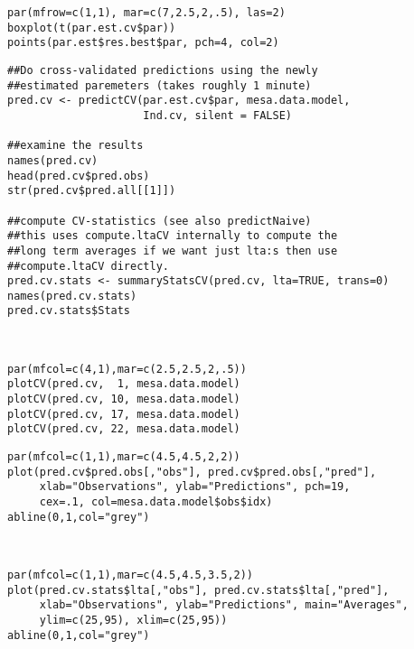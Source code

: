 %
\vspace*{-1\baselineskip}
\begin{verbatim}
par(mfrow=c(1,1), mar=c(7,2.5,2,.5), las=2)
boxplot(t(par.est.cv$par))
points(par.est$res.best$par, pch=4, col=2)
\end{verbatim}
\begin{verbatim}
##Do cross-validated predictions using the newly 
##estimated paremeters (takes roughly 1 minute)
pred.cv <- predictCV(par.est.cv$par, mesa.data.model,
                     Ind.cv, silent = FALSE)

##examine the results
names(pred.cv)
head(pred.cv$pred.obs)
str(pred.cv$pred.all[[1]])

##compute CV-statistics (see also predictNaive)
##this uses compute.ltaCV internally to compute the
##long term averages if we want just lta:s then use 
##compute.ltaCV directly.
pred.cv.stats <- summaryStatsCV(pred.cv, lta=TRUE, trans=0)
names(pred.cv.stats)
pred.cv.stats$Stats
\end{verbatim}
\\
%
\vspace*{-1\baselineskip}
\begin{verbatim}
par(mfcol=c(4,1),mar=c(2.5,2.5,2,.5))
plotCV(pred.cv,  1, mesa.data.model)
plotCV(pred.cv, 10, mesa.data.model)
plotCV(pred.cv, 17, mesa.data.model)
plotCV(pred.cv, 22, mesa.data.model)
\end{verbatim}
%
\vspace*{-1\baselineskip}
\begin{verbatim}
par(mfcol=c(1,1),mar=c(4.5,4.5,2,2))
plot(pred.cv$pred.obs[,"obs"], pred.cv$pred.obs[,"pred"],
     xlab="Observations", ylab="Predictions", pch=19,
     cex=.1, col=mesa.data.model$obs$idx)
abline(0,1,col="grey")
\end{verbatim}
 \\
%
\vspace*{-1\baselineskip}
\begin{verbatim}
par(mfcol=c(1,1),mar=c(4.5,4.5,3.5,2))
plot(pred.cv.stats$lta[,"obs"], pred.cv.stats$lta[,"pred"],
     xlab="Observations", ylab="Predictions", main="Averages",
     ylim=c(25,95), xlim=c(25,95))
abline(0,1,col="grey")
\end{verbatim}
